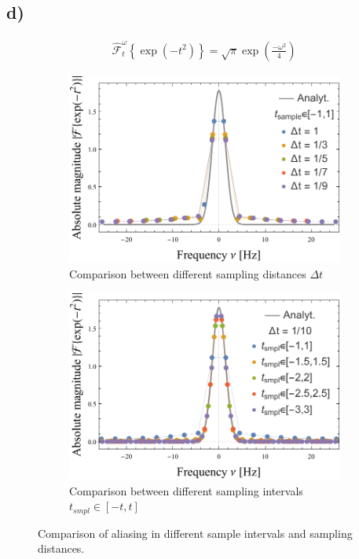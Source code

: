 \documentclass[12pt,a4paper]{article}
\begin{document}
	\subsection*{d)}
		\begin{align}
			\hat{\mathcal{F}}_t^\omega\left\{\exp\left(-t^2\right)\right\}=\sqrt{\pi}\exp\left(\frac{-\omega^2}{4}\right)
		\end{align}
		\begin{figure}[H]
			\centering
			\begin{subfigure}[b]{0.45\textwidth}
				\includegraphics[width=0.9\columnwidth]{A2/data/DT_Comparison.pdf}
				\caption[]{Comparison between different sampling distances \(\Delta t\)}
			\end{subfigure}
			\begin{subfigure}[b]{0.45\textwidth}
				\includegraphics[width=0.9\columnwidth]{A2/data/TSampling_Comparison.pdf}
				\caption[]{Comparison between different sampling intervals \(t_{smpl}\in\left[-t, t\right]\)}
			\end{subfigure}
			\caption[]{Comparison of aliasing in different sample intervals and sampling distances.}
		\end{figure}
\end{document}
